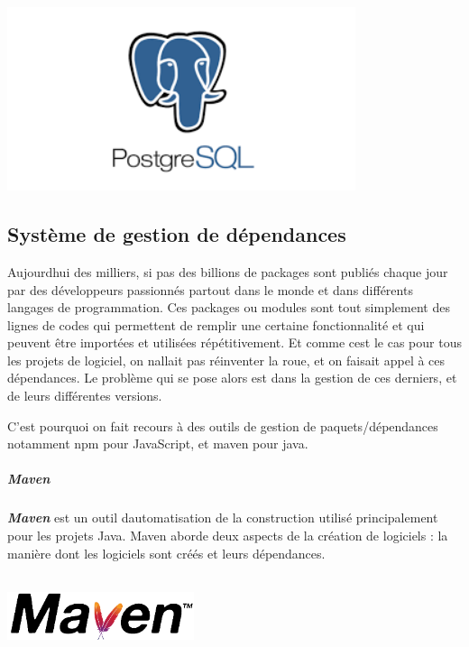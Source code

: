 \documentclass[12pt,a4paper,twoside]{report}
\begin{document}
\includegraphics[width=4.02153in,height=2.11597in]{latex_media/media/image26.png}

\hypertarget{systuxe8me-de-gestion-de-duxe9pendances}{%
\subsection{Système de gestion de
dépendances}\label{systuxe8me-de-gestion-de-duxe9pendances}}

Aujourd\textquotesingle hui des milliers, si pas des billions de
packages sont publiés chaque jour par des développeurs passionnés
partout dans le monde et dans différents langages de programmation. Ces
packages ou modules sont tout simplement des lignes de codes qui
permettent de remplir une certaine fonctionnalité et qui peuvent être
importées et utilisées répétitivement. Et comme c\textquotesingle est le
cas pour tous les projets de logiciel, on n\textquotesingle allait pas
réinventer la roue, et on faisait appel à ces dépendances. Le problème
qui se pose alors est dans la gestion de ces derniers, et de leurs
différentes versions.

C'est pourquoi on fait recours à des outils de gestion de
paquets/dépendances notamment npm pour JavaScript, et maven pour java.~

\hypertarget{maven}{%
\subparagraph{\texorpdfstring{\textbf{Maven}}{Maven}}\label{maven}}

\emph{\textbf{Maven}} est un outil d\textquotesingle automatisation de
la construction utilisé principalement pour les projets Java. Maven
aborde deux aspects de la création de logiciels : la manière dont les
logiciels sont créés et leurs dépendances.

\includegraphics[width=2.16042in,height=0.94167in]{latex_media/media/image27.png}
\end{document}
